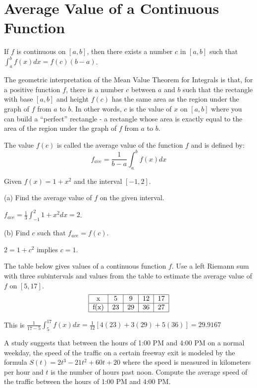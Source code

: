 \documentclass[../bccalc.tex]{subfiles}
\begin{document}
\section{Average Value of a Continuous Function}
\begin{theorem}
    If $f$ is continuous on $[a,b]$, then there exists a number $c$ in $[a,b]$ such that $\int_a^b f(x)dx=f(c)(b-a)$.
\end{theorem}

The geometric interpretation of the Mean Value Theorem for Integrals is that, for a positive function $f$, there is a number $c$ between $a$ and $b$ such that the rectangle with base $[a,b]$ and height 
$f(c)$ has the same area as the region under the graph of $f$ from $a$ to $b$. In other words, $c$ is the value of $x$ on $[a,b]$ where you can build a ``perfect'' rectangle - a rectangle whose area is exactly equal to the area of the region under the graph of $f$ from $a$ to $b$.

The value $f(c)$ is called the average value of the function $f$ and is defined by:
\[ f_{ave}=\frac{1}{b-a}\int_a^b f(x)dx\]

\begin{example}
    Given $f(x)=1+x^2$ and the interval $[-1,2]$.

    (a) Find the average value of $f$ on the given interval.

    $f_{ave}=\frac{1}{3}\int_{-1}^2 1+x^2dx = 2$.

    (b) Find $c$ such that $f_{ave}=f(c)$.

    $2=1+c^2$ implies $c=1$.
\end{example}

\begin{example}
    The table below gives values of a continuous function $f$. Use a left Riemann sum with three subintervals and values from the table to estimate the average value of $f$ on $[5,17]$.
   \[ \begin{tabular}{|c|c|c|c|c|}
        \hline 
        x & 5 & 9 & 12 & 17\\ \hline 
        f(x) & 23 & 29 & 36 & 27\\\hline
        
    \end{tabular}\]

    This is $\frac{1}{17-5}\int_5^{17}f(x)dx=\frac{1}{12}[4(23)+3(29)+5(36)]=29.9167$
\end{example}

\ex A study suggests that between the hours of 1:00 PM and 4:00 PM on a normal weekday, the speed of the traffic on a certain freeway exit is modeled by the formula $S(t)=2t^3-21t^2+60t+20$ where the speed is 
measured in kilometers per hour and $t$ is the number of hours past noon. Compute the average speed of the traffic between the hours of 1:00 PM and 4:00 PM.
\end{document}
